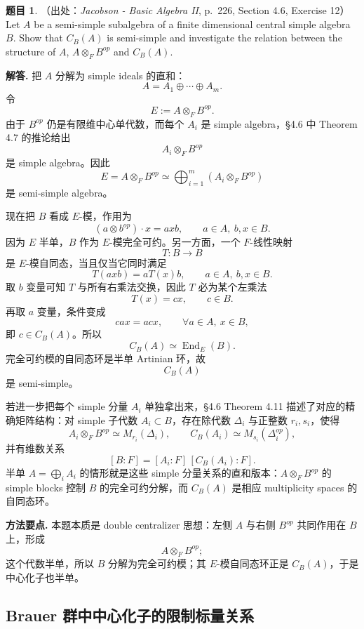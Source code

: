 \documentclass[a4paper]{ctexart}
\theoremstyle{definition}
\newtheorem{example}{题目}[section]
\theoremstyle{analysis}
\theoremstyle{plain}
\begin{document}
\begin{example}
（出处：\textit{Jacobson - Basic Algebra II}, p.~226, Section 4.6, Exercise 12）
Let \(A\) be a semi-simple subalgebra of a finite dimensional central simple algebra
\(B\). Show that \(C_B(A)\) is semi-simple and investigate the relation between the
structure of \(A\), \(A\otimes_F B^{op}\) and \(C_B(A)\).

\textbf{解答.}
把 \(A\) 分解为 simple ideals 的直和：
\[
  A=A_1\oplus\cdots\oplus A_m.
\]
令
\[
  E:=A\otimes_F B^{op}.
\]
由于 \(B^{op}\) 仍是有限维中心单代数，而每个 \(A_i\) 是 simple algebra，§4.6 中 Theorem 4.7 的推论给出
\[
  A_i\otimes_F B^{op}
\]
是 simple algebra。因此
\[
  E=A\otimes_F B^{op}
    \simeq
    \bigoplus_{i=1}^m (A_i\otimes_F B^{op})
\]
是 semi-simple algebra。

现在把 \(B\) 看成 \(E\)-模，作用为
\[
  (a\otimes b^{op})\cdot x=axb,\qquad a\in A,\ b,x\in B.
\]
因为 \(E\) 半单，\(B\) 作为 \(E\)-模完全可约。另一方面，一个 \(F\)-线性映射
\[
  T:B\longrightarrow B
\]
是 \(E\)-模自同态，当且仅当它同时满足
\[
  T(axb)=aT(x)b,\qquad a\in A,\ b,x\in B.
\]
取 \(b\) 变量可知 \(T\) 与所有右乘法交换，因此 \(T\) 必为某个左乘法
\[
  T(x)=cx,\qquad c\in B.
\]
再取 \(a\) 变量，条件变成
\[
  cax=acx,\qquad \forall a\in A,\ x\in B,
\]
即 \(c\in C_B(A)\)。所以
\[
  C_B(A)\simeq \operatorname{End}_E(B).
\]
完全可约模的自同态环是半单 Artinian 环，故
\[
  C_B(A)
\]
是 semi-simple。

若进一步把每个 simple 分量 \(A_i\) 单独拿出来，§4.6 Theorem 4.11 描述了对应的精确矩阵结构：对 simple 子代数 \(A_i\subset B\)，存在除代数 \(\Delta_i\) 与正整数 \(r_i,s_i\)，使得
\[
  A_i\otimes_F B^{op}\simeq M_{r_i}(\Delta_i),
  \qquad
  C_B(A_i)\simeq M_{s_i}(\Delta_i^{op}),
\]
并有维数关系
\[
  [B:F]=[A_i:F]\,[C_B(A_i):F].
\]
半单 \(A=\bigoplus_i A_i\) 的情形就是这些 simple 分量关系的直和版本：\(A\otimes_F B^{op}\) 的 simple blocks 控制 \(B\) 的完全可约分解，而 \(C_B(A)\) 是相应 multiplicity spaces 的自同态环。

\textbf{方法要点.}
本题本质是 double centralizer 思想：左侧 \(A\) 与右侧 \(B^{op}\) 共同作用在 \(B\) 上，形成
\[
  A\otimes_F B^{op};
\]
这个代数半单，所以 \(B\) 分解为完全可约模；其 \(E\)-模自同态环正是 \(C_B(A)\)，于是中心化子也半单。
\end{example}

\subsection{Brauer 群中中心化子的限制标量关系}\label{subsec:problem-brauer-centralizer-restriction}
\end{document}
